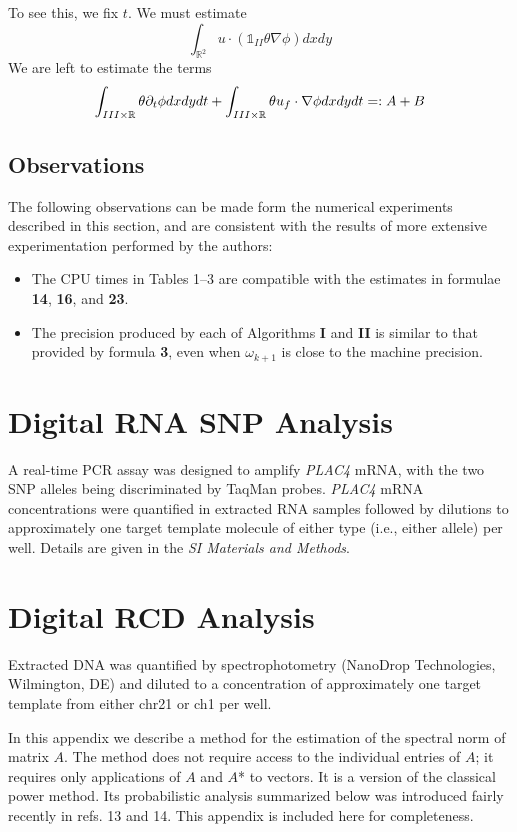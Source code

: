 \documentclass{pnastwo}
\begin{document}
\begin{article}
To see this, we fix $t$. We must estimate
\[
\int_{\mathbb{R}^2} u\cdot(\mathbb{1}_{II}\theta\nabla\phi) dx dy
\]
We are left to estimate the terms
\[
\int_{III\times \mathbb{R}} \theta \partial_t\phi dx dy
dt+\int_{III\times \mathbb{R}} \theta u_f\cdot \nabla \phi dx dy
dt=:A+B
\]

\subsection{Observations}
The following observations can be made form the numerical experiments
described in this section, and are consistent with the results
of more extensive experimentation performed by the authors:
\begin{itemize}
\item The CPU times in Tables 1--3 are compatible with the estimates in
formulae {\bf 14}, {\bf 16}, and {\bf 23}.
\item
The precision produced by each of Algorithms {\bf I} and {\bf II}
is similar to that provided by formula {\bf 3}, even when
$\omega_{k+1}$ is close to the machine precision.
\end{itemize}




\begin{materials}
\section{Digital RNA SNP Analysis} A real-time PCR assay was designed
to amplify {\it PLAC4} mRNA, with the two SNP alleles being discriminated
by TaqMan probes. {\it PLAC4} mRNA concentrations were quantified in
extracted RNA samples followed by dilutions to approximately one target
template molecule of either type (i.e., either allele) per well.
Details are given in the {\it SI Materials and Methods}.

\section{Digital RCD Analysis} Extracted DNA was quantified by
spectrophotometry (NanoDrop Technologies, Wilmington, DE) and diluted to a
concentration of 
approximately one target template from either chr21 or ch1 per well.
\end{materials}

In this appendix we describe a method for the estimation of the spectral norm
of matrix $A$. The method does not require access to the individual
entries of $A$; it requires only applications of $A$ and $A$* to vectors.
It is a version of the classical power method. Its probabilistic
analysis summarized below was introduced fairly recently in refs. 13
and 14. This appendix is included here for completeness.



\end{article}
\end{document}
